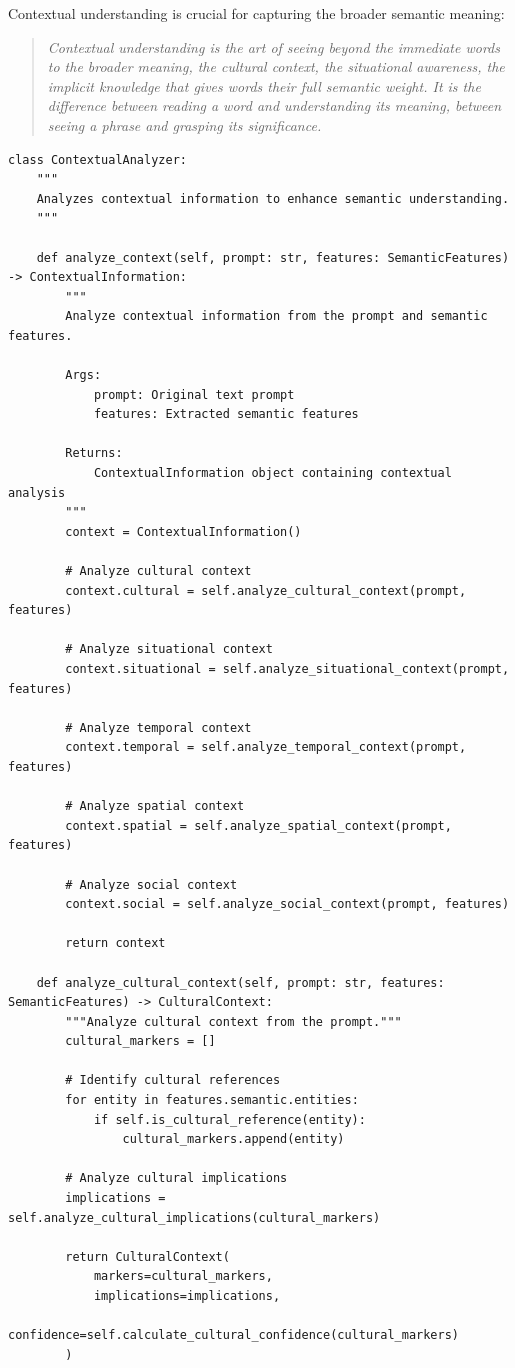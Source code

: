 \documentclass[11pt]{article}
\begin{document}
Contextual understanding is crucial for capturing the broader semantic meaning:

\begin{quote}
\emph{Contextual understanding is the art of seeing beyond the immediate words to the broader meaning, the cultural context, the situational awareness, the implicit knowledge that gives words their full semantic weight. It is the difference between reading a word and understanding its meaning, between seeing a phrase and grasping its significance.}
\end{quote}

\begin{lstlisting}[style=python]
class ContextualAnalyzer:
    """
    Analyzes contextual information to enhance semantic understanding.
    """
    
    def analyze_context(self, prompt: str, features: SemanticFeatures) -> ContextualInformation:
        """
        Analyze contextual information from the prompt and semantic features.
        
        Args:
            prompt: Original text prompt
            features: Extracted semantic features
            
        Returns:
            ContextualInformation object containing contextual analysis
        """
        context = ContextualInformation()
        
        # Analyze cultural context
        context.cultural = self.analyze_cultural_context(prompt, features)
        
        # Analyze situational context
        context.situational = self.analyze_situational_context(prompt, features)
        
        # Analyze temporal context
        context.temporal = self.analyze_temporal_context(prompt, features)
        
        # Analyze spatial context
        context.spatial = self.analyze_spatial_context(prompt, features)
        
        # Analyze social context
        context.social = self.analyze_social_context(prompt, features)
        
        return context
    
    def analyze_cultural_context(self, prompt: str, features: SemanticFeatures) -> CulturalContext:
        """Analyze cultural context from the prompt."""
        cultural_markers = []
        
        # Identify cultural references
        for entity in features.semantic.entities:
            if self.is_cultural_reference(entity):
                cultural_markers.append(entity)
        
        # Analyze cultural implications
        implications = self.analyze_cultural_implications(cultural_markers)
        
        return CulturalContext(
            markers=cultural_markers,
            implications=implications,
            confidence=self.calculate_cultural_confidence(cultural_markers)
        )
\end{lstlisting}
\end{document}

